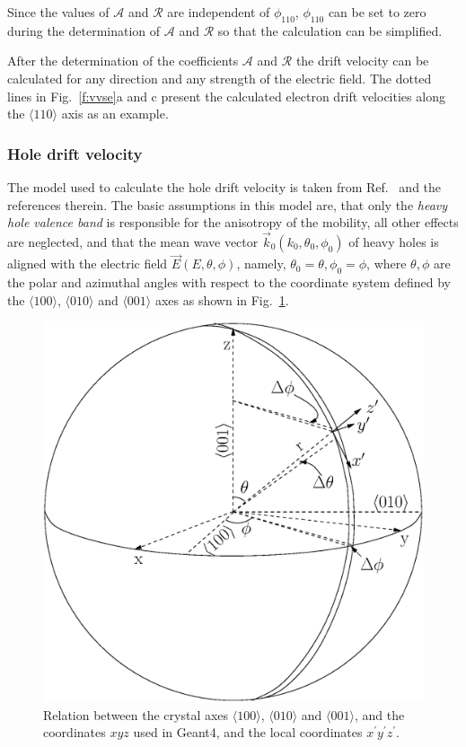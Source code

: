 \documentclass[epj]{svjour}
\begin{document}
Since the values of $\mathcal{A}$ and $\mathcal{R}$ are independent of
$\phi_{110}$, $\phi_{110}$ can be set to zero during the determination
of $\mathcal{A}$ and $\mathcal{R}$ so that the calculation can be
simplified.

After the determination of the coefficients $\mathcal{A}$ and
$\mathcal{R}$ the drift velocity can be calculated for any direction
and any strength of the electric field. The dotted lines in
Fig.~\ref{f:vvse}a and c present the calculated electron drift
velocities along the $\langle 110 \rangle$ axis as an example.
 
\subsubsection{Hole drift velocity} 
\label{s:hole} 
The model used to calculate the hole drift velocity is taken from
Ref.~\cite{bart} and the references therein. The basic assumptions in
this model are, that only the \emph{heavy hole valence band}
\cite{heavy} is responsible for the anisotropy of the mobility, all
other effects are neglected, and that the mean wave vector
$\vec{k}_{0}(k_{0}, \theta_{0}, \phi_{0})$ of heavy holes is aligned
with the electric field $\vec{E}(E, \theta, \phi)$, namely,
$\theta_{0} = \theta, \phi_{0} = \phi$, where $\theta, \phi$ are the
polar and azimuthal angles with respect to the coordinate system
defined by the $\langle 100 \rangle$, $\langle 010 \rangle$ and
$\langle 001 \rangle$ axes as shown in Fig.~\ref{f:vsphere}.
 
\begin{figure}[htpb]
\centering
\includegraphics[width=0.8\linewidth]{vsphere}   
\caption{Relation between the crystal axes $\langle100\rangle$,
$\langle010\rangle$ and $\langle001\rangle$, and the coordinates $xyz$
used in Geant4, and the local coordinates
$x^{\prime}y^{\prime}z^{\prime}$.}
\label{f:vsphere} 
\end{figure} 
 
\end{document}
